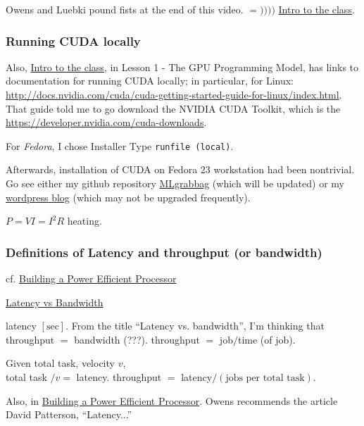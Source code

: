 \documentclass[10pt]{amsart}
\begin{document}
\begin{multicols*}{2}
Owens and Luebki pound fists at the end of this video.  $=))))$  \href{https://classroom.udacity.com/courses/cs344/lessons/55120467/concepts/658304810923}{Intro to the class}.

\subsubsection{Running CUDA locally}
Also, \href{https://classroom.udacity.com/courses/cs344/lessons/55120467/concepts/658304810923}{Intro to the class}, in Lesson 1 - The GPU Programming Model, has links to documentation for running CUDA locally; in particular, for Linux: \url{http://docs.nvidia.com/cuda/cuda-getting-started-guide-for-linux/index.html}.  That guide told me to go download the NVIDIA CUDA Toolkit, which is the \href{NVIDIA CUDA Developer Toolkit}{https://developer.nvidia.com/cuda-downloads}.  

For \emph{Fedora}, I chose Installer Type \verb|runfile (local)|.  

Afterwards, installation of CUDA on Fedora 23 workstation had been nontrivial.  Go see either my github repository \href{https://github.com/ernestyalumni/MLgrabbag/blob/master/README.md}{MLgrabbag} (which will be updated) or my \href{https://ernestyalumni.wordpress.com/2016/05/07/fedora-23-workstation-linuxnvidia-geforce-gtx-980-ti-my-experience-log-of-what-i-do-and-find-out/#CUDAinstall}{wordpress blog} (which may not be upgraded frequently).  


$P=VI = I^2R$ heating.

\subsubsection{Definitions of Latency and throughput (or bandwidth)}

cf. 
\href{https://classroom.udacity.com/courses/cs344/lessons/55120467/concepts/669874580923}{Building a Power Efficient Processor}

\href{https://classroom.udacity.com/courses/cs344/lessons/55120467/concepts/667559300923}{Latency vs Bandwidth}

latency $[\text{sec}]$.  From the title ``Latency vs. bandwidth'', I'm thinking that throughput $=$ bandwidth (???).  throughput $ = $ job$/$time (of job).  

Given total task, velocity $v$, \\
total task $/v = $ latency.  throughput $=$ latency$/(\text{jobs per total task})$.  


Also, in \href{https://classroom.udacity.com/courses/cs344/lessons/55120467/concepts/669874580923}{Building a Power Efficient Processor}.  Owens recommends the article David Patterson, ``Latency...''


\end{multicols*}
\end{document}
